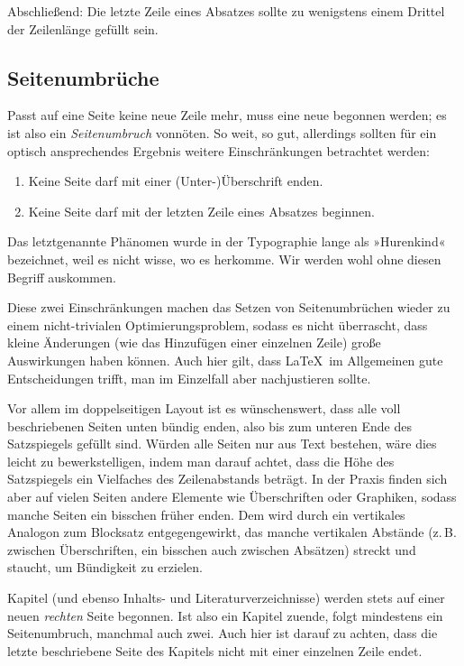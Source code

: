 Abschließend: Die letzte Zeile eines Absatzes sollte zu wenigstens einem Drittel
der Zeilenlänge gefüllt sein.

\subsection{Seitenumbrüche}

Passt auf eine Seite keine neue Zeile mehr, muss eine neue begonnen werden; es
ist also ein \emph{Seitenumbruch} vonnöten. So weit, so gut, allerdings sollten
für ein optisch ansprechendes Ergebnis weitere Einschränkungen betrachtet
werden:
\begin{enumerate}
\item Keine Seite darf mit einer (Unter-)Überschrift enden.
\item Keine Seite darf mit der letzten Zeile eines Absatzes beginnen.
\end{enumerate}
Das letztgenannte Phänomen wurde in der Typographie lange als »Hurenkind«
bezeichnet, weil es nicht wisse, wo es herkomme. Wir werden wohl ohne diesen Begriff
auskommen.

Diese zwei Einschränkungen machen das Setzen von Seitenumbrüchen wieder zu einem
nicht-trivialen Optimierungsproblem, sodass es nicht überrascht, dass
kleine Änderungen (wie das Hinzufügen einer einzelnen Zeile) große Auswirkungen
haben können. Auch hier gilt, dass \LaTeX\ im Allgemeinen gute Entscheidungen
trifft, man im Einzelfall aber nachjustieren sollte.

Vor allem im doppelseitigen Layout ist es wünschenswert, dass alle voll
beschriebenen Seiten unten bündig enden, also bis zum unteren Ende des
Satzspiegels gefüllt sind. Würden alle Seiten nur aus Text bestehen, wäre dies
leicht zu bewerkstelligen, indem man darauf achtet, dass die Höhe des
Satzspiegels ein Vielfaches des Zeilenabstands beträgt. In
der Praxis finden sich aber auf vielen Seiten andere Elemente wie Überschriften
oder Graphiken, sodass manche Seiten ein bisschen früher enden. Dem wird durch
ein vertikales Analogon zum Blocksatz entgegengewirkt, das manche vertikalen
Abstände (z.\,B. zwischen Überschriften, ein bisschen auch zwischen Absätzen)
streckt und staucht, um Bündigkeit zu erzielen.

Kapitel (und ebenso Inhalts- und Literaturverzeichnisse) werden stets auf einer
neuen \emph{rechten} Seite begonnen. Ist also ein Kapitel zuende, folgt
mindestens ein Seitenumbruch, manchmal auch zwei. Auch hier ist darauf zu
achten, dass die letzte beschriebene Seite des Kapitels nicht mit einer
einzelnen Zeile endet.


